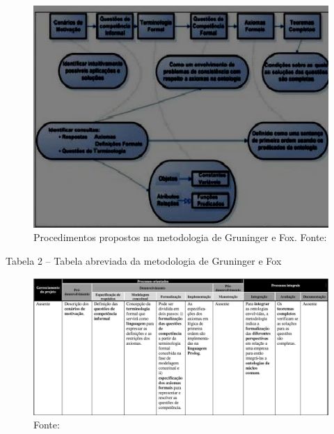 \documentclass[a4paper]{report}
\begin{document}
\begin{figure}[h] 
\centering %
\includegraphics[scale=0.65]{Figuras/3.png} %
\caption[Procedimentos propostos na metodologia de Gruninger e Fox]{Procedimentos propostos na metodologia de Gruninger e Fox. Fonte: \cite{DanielaLucas:2008}}
\end{figure}

Tabela 2 – Tabela abreviada da metodologia de Gruninger e Fox

\begin{figure}[h] 
\centering %
\includegraphics[scale=0.4]{Figuras/4.png} %
\caption{Fonte: \cite{DanielaLucas:2008}}
\end{figure}
\end{document}
